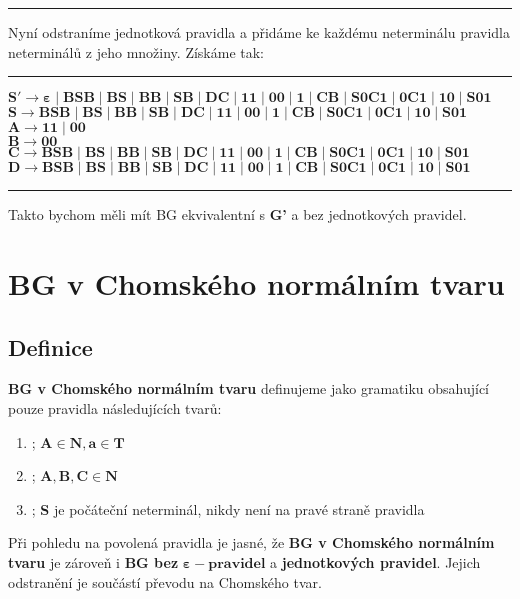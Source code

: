 \documentclass{report}
\begin{document}
\vspace{0.1cm}    
\hrule
\vspace{0.4cm}
Nyní odstraníme jednotková pravidla a přidáme ke každému neterminálu pravidla neterminálů z jeho množiny. Získáme tak:
\vspace{0.4cm}    
\hrule
\vspace{0.1cm}
\begin{description}
    \item[$\mathbf{S' \rightarrow \varepsilon \mid BSB \mid BS \mid BB \mid SB \mid DC \mid  11 \mid 00 \mid 1 \mid  CB \mid S0C1 \mid 0C1 \mid 10 \mid S01}$]
    \item[$\mathbf{S \rightarrow BSB \mid BS \mid BB \mid SB \mid DC \mid  11 \mid 00 \mid 1 \mid  CB \mid S0C1 \mid 0C1 \mid 10 \mid S01 }$]
    \item[$\mathbf{A \rightarrow 11 \mid 00}$]
    \item[$\mathbf{B \rightarrow 00}$]
    \item[$\mathbf{C \rightarrow BSB \mid BS \mid BB \mid SB \mid DC \mid  11 \mid 00 \mid 1 \mid  CB \mid S0C1 \mid 0C1 \mid 10 \mid S01 }$]
    \item[$\mathbf{D \rightarrow BSB \mid BS \mid BB \mid SB \mid DC \mid  11 \mid 00 \mid 1 \mid  CB \mid S0C1 \mid 0C1 \mid 10 \mid S01 }$]
\end{description}
\vspace{0.1cm}    
\hrule
\vspace{0.4cm}
Takto bychom měli mít BG ekvivalentní s \textbf{G'} a bez jednotkových pravidel.
\section{BG v Chomského normálním tvaru}
\subsection*{Definice}
\textbf{BG v Chomského normálním tvaru} definujeme jako gramatiku obsahující pouze pravidla následujících tvarů:
\begin{enumerate}
    \item[]  ; $\mathbf{A \in N, a \in T}$
    \item[]  ; $\mathbf{A,B,C \in N}$
    \item[]  ; \textbf{S} je počáteční neterminál, nikdy není na pravé straně pravidla
\end{enumerate}
Při pohledu na povolená pravidla je jasné, že \textbf{BG v Chomského normálním tvaru} je zároveň i \textbf{BG bez} $\mathbf{\varepsilon-pravidel}$ a \textbf{jednotkových pravidel}. Jejich odstranění je součástí převodu na Chomského tvar.
\end{document}
